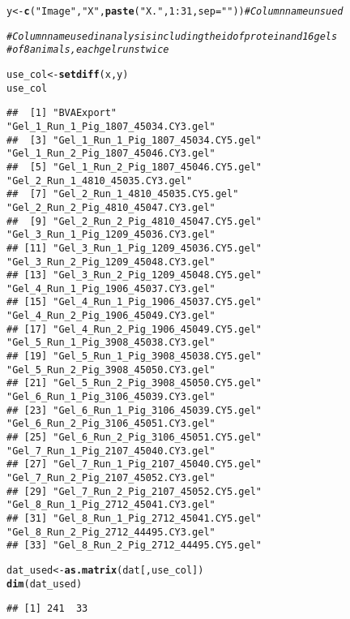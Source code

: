 \documentclass{article}\usepackage[]{graphicx}\usepackage[]{color}
\makeatletter
\newcommand{\hlnum}[1]{\textcolor[rgb]{0.686,0.059,0.569}{#1}}%
\newcommand{\hlstr}[1]{\textcolor[rgb]{0.192,0.494,0.8}{#1}}%
\newcommand{\hlcom}[1]{\textcolor[rgb]{0.678,0.584,0.686}{\textit{#1}}}%
\newcommand{\hlopt}[1]{\textcolor[rgb]{0,0,0}{#1}}%
\newcommand{\hlstd}[1]{\textcolor[rgb]{0.345,0.345,0.345}{#1}}%
\newcommand{\hlkwb}[1]{\textcolor[rgb]{0.69,0.353,0.396}{#1}}%
\newcommand{\hlkwc}[1]{\textcolor[rgb]{0.333,0.667,0.333}{#1}}%
\newcommand{\hlkwd}[1]{\textcolor[rgb]{0.737,0.353,0.396}{\textbf{#1}}}%
\newenvironment{kframe}{%
 \def\at@end@of@kframe{}%
 \ifinner\ifhmode%
  \def\at@end@of@kframe{\end{minipage}}%
  \begin{minipage}{\columnwidth}%
 \fi\fi%
 \def\FrameCommand##1{\hskip\@totalleftmargin \hskip-\fboxsep
 \colorbox{shadecolor}{##1}\hskip-\fboxsep
     \hskip-\linewidth \hskip-\@totalleftmargin \hskip\columnwidth}%
 \MakeFramed {\advance\hsize-\width
   \@totalleftmargin\z@ \linewidth\hsize
   \@setminipage}}%
 {\par\unskip\endMakeFramed%
 \at@end@of@kframe}
\newenvironment{knitrout}{}{} %
\makeatother
\begin{document}
\begin{knitrout}
\color{fgcolor}\begin{kframe}
\begin{alltt}
\hlstd{y} \hlkwb{<-} \hlkwd{c}\hlstd{(} \hlstr{"Image"}\hlstd{,}\hlstr{"X"}\hlstd{,} \hlkwd{paste}\hlstd{(}\hlstr{"X."}\hlstd{,} \hlnum{1}\hlopt{:}\hlnum{31}\hlstd{,} \hlkwc{sep} \hlstd{=} \hlstr{""}\hlstd{))} \hlcom{# Column name unsued}

\hlcom{# Column name used in analysis including the id of protein and 16 gels  }
\hlcom{# of 8 animals, each gel runs twice}

\hlstd{use_col} \hlkwb{<-} \hlkwd{setdiff}\hlstd{(x,y)}
\hlstd{use_col}
\end{alltt}
\begin{verbatim}
##  [1] "BVAExport"                          "Gel_1_Run_1_Pig_1807_45034.CY3.gel"
##  [3] "Gel_1_Run_1_Pig_1807_45034.CY5.gel" "Gel_1_Run_2_Pig_1807_45046.CY3.gel"
##  [5] "Gel_1_Run_2_Pig_1807_45046.CY5.gel" "Gel_2_Run_1_4810_45035.CY3.gel"    
##  [7] "Gel_2_Run_1_4810_45035.CY5.gel"     "Gel_2_Run_2_Pig_4810_45047.CY3.gel"
##  [9] "Gel_2_Run_2_Pig_4810_45047.CY5.gel" "Gel_3_Run_1_Pig_1209_45036.CY3.gel"
## [11] "Gel_3_Run_1_Pig_1209_45036.CY5.gel" "Gel_3_Run_2_Pig_1209_45048.CY3.gel"
## [13] "Gel_3_Run_2_Pig_1209_45048.CY5.gel" "Gel_4_Run_1_Pig_1906_45037.CY3.gel"
## [15] "Gel_4_Run_1_Pig_1906_45037.CY5.gel" "Gel_4_Run_2_Pig_1906_45049.CY3.gel"
## [17] "Gel_4_Run_2_Pig_1906_45049.CY5.gel" "Gel_5_Run_1_Pig_3908_45038.CY3.gel"
## [19] "Gel_5_Run_1_Pig_3908_45038.CY5.gel" "Gel_5_Run_2_Pig_3908_45050.CY3.gel"
## [21] "Gel_5_Run_2_Pig_3908_45050.CY5.gel" "Gel_6_Run_1_Pig_3106_45039.CY3.gel"
## [23] "Gel_6_Run_1_Pig_3106_45039.CY5.gel" "Gel_6_Run_2_Pig_3106_45051.CY3.gel"
## [25] "Gel_6_Run_2_Pig_3106_45051.CY5.gel" "Gel_7_Run_1_Pig_2107_45040.CY3.gel"
## [27] "Gel_7_Run_1_Pig_2107_45040.CY5.gel" "Gel_7_Run_2_Pig_2107_45052.CY3.gel"
## [29] "Gel_7_Run_2_Pig_2107_45052.CY5.gel" "Gel_8_Run_1_Pig_2712_45041.CY3.gel"
## [31] "Gel_8_Run_1_Pig_2712_45041.CY5.gel" "Gel_8_Run_2_Pig_2712_44495.CY3.gel"
## [33] "Gel_8_Run_2_Pig_2712_44495.CY5.gel"
\end{verbatim}
\begin{alltt}
\hlstd{dat_used} \hlkwb{<-} \hlkwd{as.matrix}\hlstd{(dat[, use_col])}
\hlkwd{dim}\hlstd{(dat_used)}
\end{alltt}
\begin{verbatim}
## [1] 241  33
\end{verbatim}
\end{kframe}
\end{knitrout}
\end{document}

